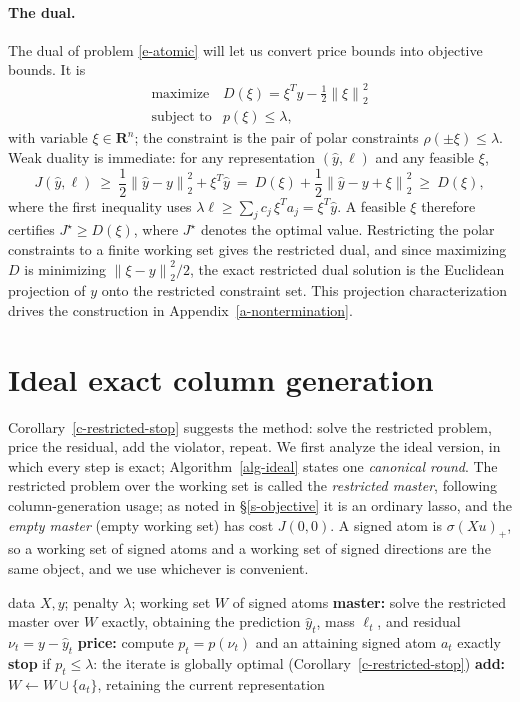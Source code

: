 \documentclass[12pt]{article}
\theoremstyle{plain}
\theoremstyle{definition}
\newcommand{\reals}{\mathbf{R}}
\newcommand{\norm}[1]{\left\lVert #1\right\rVert}
\newcommand{\relu}[1]{\left(#1\right)_+}
\newcommand{\yhat}{\widehat y}
\begin{document}
\paragraph{The dual.}
The dual of problem \eqref{e-atomic} will let us convert price bounds into
objective bounds. It is
\begin{equation}\label{e-dual}
\begin{array}{ll}
\mbox{maximize} & D(\xi)=\xi^Ty-\frac12\norm\xi_2^2\\
\mbox{subject to} & p(\xi)\le\lambda,
\end{array}
\end{equation}
with variable $\xi\in\reals^n$; the constraint is the pair of polar
constraints $\rho(\pm\xi)\le\lambda$. Weak duality is immediate: for any
representation $(\yhat,\ell)$ and any feasible $\xi$,
\[
  J(\yhat,\ell)\ \ge\ \frac12\norm{\yhat-y}_2^2+\xi^T\yhat
  \ =\ D(\xi)+\frac12\norm{\yhat-y+\xi}_2^2\ \ge\ D(\xi),
\]
where the first inequality uses $\lambda\ell\ge\sum_jc_j\,\xi^Ta_j
=\xi^T\yhat$. A feasible $\xi$ therefore certifies
$J^\star\ge D(\xi)$, where $J^\star$ denotes the optimal value. Restricting the polar constraints to a finite working set gives the
restricted dual, and since maximizing $D$ is minimizing
$\norm{\xi-y}_2^2/2$, the exact restricted dual solution is the Euclidean
projection of $y$ onto the restricted constraint set. This projection
characterization drives the construction in
Appendix~\ref{a-nontermination}.

\section{Ideal exact column generation}\label{s-ideal}

Corollary~\ref{c-restricted-stop} suggests the method: solve the restricted
problem, price the residual, add the violator, repeat. We first analyze the
ideal version, in which every step is exact; Algorithm~\ref{alg-ideal} states
one \emph{canonical round}. The restricted problem over the working set is
called the \emph{restricted master}, following column-generation usage; as
noted in \S\ref{s-objective} it is an ordinary lasso, and the \emph{empty
master} (empty working set) has cost $J(0,0)$. A signed atom is
$\sigma\relu{Xu}$, so a working set of signed atoms and a working set of
signed directions are the same object, and we use whichever is convenient.

\begin{algorithm}[tb]
\caption{Ideal exact RCG (one canonical round)}\label{alg-ideal}
\begin{algorithmic}[1]
\Require data $X,y$; penalty $\lambda$; working set $W$ of signed atoms
\State \textbf{master:} solve the restricted master over $W$ exactly,
  obtaining the prediction $\yhat_t$, mass $\ell_t$, and residual
  $\nu_t=y-\yhat_t$
\State \textbf{price:} compute $p_t=p(\nu_t)$ and an attaining signed atom
  $a_t$ exactly
\State \textbf{stop} if $p_t\le\lambda$: the iterate is globally optimal
  (Corollary~\ref{c-restricted-stop})
\State \textbf{add:} $W\gets W\cup\{a_t\}$, retaining the current
  representation
\end{algorithmic}
\end{algorithm}
\end{document}
